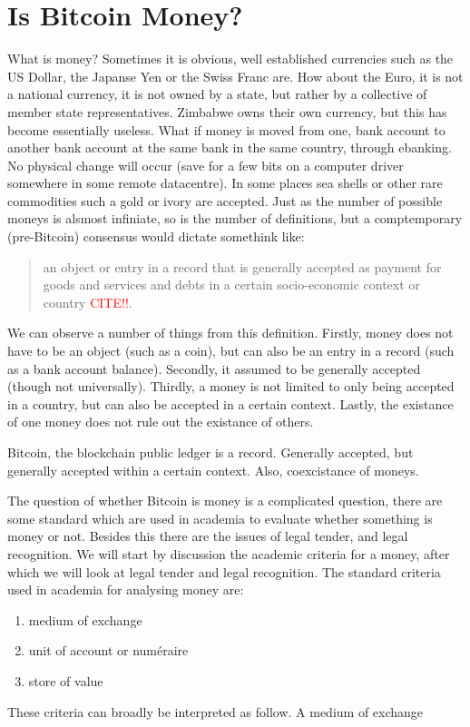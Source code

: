 
\chapter{Is Bitcoin Money?}

What is money? Sometimes it is obvious, well established currencies
such as the US Dollar, the Japanse Yen or the Swiss Franc are. How
about the Euro, it is not a national currency, it is not owned by
a state, but rather by a collective of member state representatives.
Zimbabwe owns their own currency, but this has become essentially
useless. What if money is moved from one, bank account to another
bank account at the same bank in the same country, through ebanking.
No physical change will occur (save for a few bits on a computer driver
somewhere in some remote datacentre). In some places sea shells or
other rare commodities such a gold or ivory are accepted. Just as
the number of possible moneys is alsmost infiniate, so is the number
of definitions, but a comptemporary (pre-Bitcoin) consensus would
dictate somethink like: 
\begin{quotation}
an object or entry in a record that is generally accepted as payment
for goods and services and debts in a certain socio-economic context
or country \textcolor{red}{CITE!!}.
\end{quotation}
We can observe a number of things from this definition. Firstly, money
does not have to be an object (such as a coin), but can also be an
entry in a record (such as a bank account balance). Secondly, it assumed
to be generally accepted (though not universally). Thirdly, a money
is not limited to only being accepted in a country, but can also be
accepted in a certain context. Lastly, the existance of one money
does not rule out the existance of others.

Bitcoin, the blockchain public ledger is a record. Generally accepted,
but generally accepted within a certain context. Also, coexcistance
of moneys.

The question of whether Bitcoin is money is a complicated question,
there are some standard which are used in academia to evaluate whether
something is money or not. Besides this there are the issues of legal
tender, and legal recognition. We will start by discussion the academic
criteria for a money, after which we will look at legal tender and
legal recognition. The standard criteria used in academia for analysing
money are:
\begin{enumerate}
\item medium of exchange
\item unit of account or numéraire
\item store of value
\end{enumerate}
These criteria can broadly be interpreted as follow. A medium of exchange

